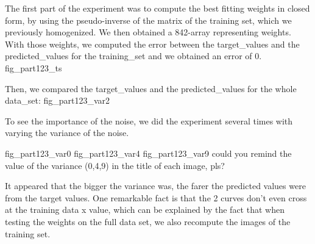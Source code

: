 The first part of the experiment was to compute the best fitting weights in closed form, by using the pseudo-inverse of the matrix of the training set, which we previously homogenized. We then obtained a 842-array representing weights. With those weights, we computed the error between the target_values and the predicted_values for the training_set and we obtained an error of 0.
          fig_part123_ts

Then, we compared the target_values and the predicted_values for the whole data_set:
            fig_part123_var2

To see the importance of the noise, we did the experiment several times with varying the variance of the noise.
          
          fig_part123_var0  
          fig_part123_var4
          fig_part123_var9          could you remind the value of the variance (0,4,9) in the title of each image, pls? 

It appeared that the bigger the variance was, the farer the predicted values were from the target values. One remarkable fact is that the 2 curves don't even cross at the training data x value, which can be explained by the fact that when testing the weights on the full data set, we also recompute the images of the training set.




